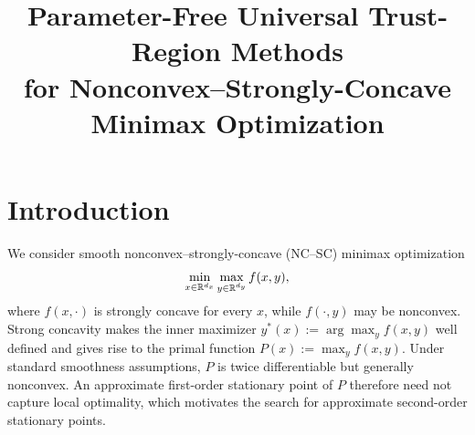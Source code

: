 \documentclass{article}
\title{Parameter-Free Universal Trust-Region Methods\\
for Nonconvex--Strongly-Concave Minimax Optimization}
\author{}
\date{}
\begin{document}
\maketitle


\section{Introduction}
\label{sec:introduction}

We consider smooth nonconvex--strongly-concave (NC--SC) minimax
optimization
\begin{equation}\label{eq:minimax-intro}
 \min_{x\in\mathbb{R}^{d_x}}\max_{y\in\mathbb{R}^{d_y}}f(x,y),
\end{equation}
where $f(x,\cdot)$ is strongly concave for every $x$, while
$f(\cdot,y)$ may be nonconvex. Strong concavity makes the inner
maximizer $y^*(x):=\arg\max_y f(x,y)$ well defined and gives rise to
the primal function $P(x):=\max_y f(x,y)$.
Under standard smoothness assumptions, $P$ is twice differentiable
but generally nonconvex. An approximate first-order stationary point
of $P$ therefore need not capture local optimality, which motivates
the search for approximate second-order stationary points.
\end{document}

